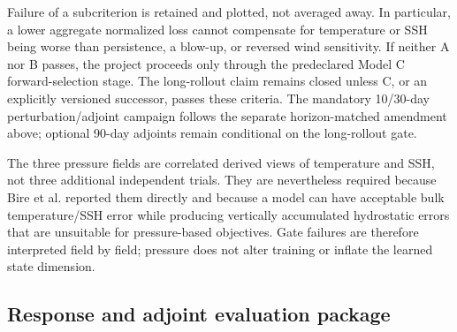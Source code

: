 \documentclass[11pt]{article}
\begin{document}
Failure of a subcriterion is retained and plotted, not averaged away.  In particular,
a lower aggregate normalized loss cannot compensate for temperature or SSH being worse
than persistence, a blow-up, or reversed wind sensitivity.  If neither A nor B passes,
the project proceeds only through the predeclared Model C forward-selection stage.
The long-rollout claim remains closed unless C, or an explicitly versioned successor,
passes these criteria.  The mandatory 10/30-day perturbation/adjoint campaign follows
the separate horizon-matched amendment above; optional 90-day adjoints remain
conditional on the long-rollout gate.

The three pressure fields are correlated derived views of temperature and SSH, not three
additional independent trials.  They are nevertheless required because Bire et al.
reported them directly and because a model can have acceptable bulk temperature/SSH
error while producing vertically accumulated hydrostatic errors that are unsuitable for
pressure-based objectives.  Gate failures are therefore interpreted field by field;
pressure does not alter training or inflate the learned state dimension.

\subsection{Response and adjoint evaluation package}
\end{document}
